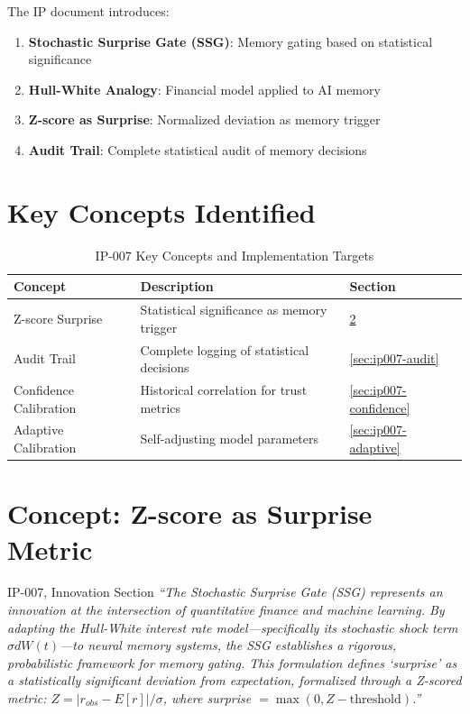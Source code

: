 The IP document introduces:
\begin{enumerate}[nosep]
    \item \textbf{Stochastic Surprise Gate (SSG)}: Memory gating based on statistical significance
    \item \textbf{Hull-White Analogy}: Financial model applied to AI memory
    \item \textbf{Z-score as Surprise}: Normalized deviation as memory trigger
    \item \textbf{Audit Trail}: Complete statistical audit of memory decisions
\end{enumerate}

\section{Key Concepts Identified}

\begin{table}[H]
\centering
\caption{IP-007 Key Concepts and Implementation Targets}
\label{tab:ip007-concepts}
\begin{tabularx}{\textwidth}{@{}p{3.5cm}Xl@{}}
\toprule
\textbf{Concept} & \textbf{Description} & \textbf{Section} \\
\midrule
Z-score Surprise & Statistical significance as memory trigger & \ref{sec:ip007-zscore} \\
Audit Trail & Complete logging of statistical decisions & \ref{sec:ip007-audit} \\
Confidence Calibration & Historical correlation for trust metrics & \ref{sec:ip007-confidence} \\
Adaptive Calibration & Self-adjusting model parameters & \ref{sec:ip007-adaptive} \\
\bottomrule
\end{tabularx}
\end{table}

\section{Concept: Z-score as Surprise Metric}
\label{sec:ip007-zscore}

\begin{ipsourcebox}{IP-007, Innovation Section}
\textit{``The Stochastic Surprise Gate (SSG) represents an innovation at the intersection of quantitative finance and machine learning. By adapting the Hull-White interest rate model---specifically its stochastic shock term $\sigma dW(t)$---to neural memory systems, the SSG establishes a rigorous, probabilistic framework for memory gating. This formulation defines `surprise' as a statistically significant deviation from expectation, formalized through a Z-scored metric: $Z = |r_{obs} - E[r]| / \sigma$, where surprise $= \max(0, Z - \text{threshold})$.''}
\end{ipsourcebox}


